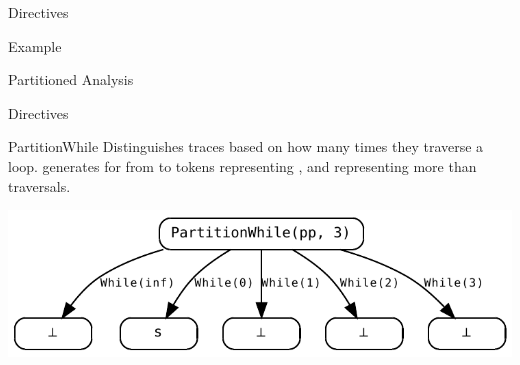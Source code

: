 \documentclass{beamer}
\begin{document}
\begin{section}{Directives}
\begin{frame}[t]{Example}
\begin{block}{Partitioned Analysis}
\begin{center}
			\end{center}
		\end{block}
	\end{frame}


	\begin{frame}[t]{Directives}
		\begin{block}{PartitionWhile}
			Distinguishes traces based on how many times they traverse a loop.  generates for  from  to  tokens  representing , and  representing more than  traversals.

			\begin{center}
				\includegraphics[width=\textwidth]{Graphs/PartitionWhile.pdf}
			\end{center}


\end{block}
\end{frame}
\end{section}
\end{document}
